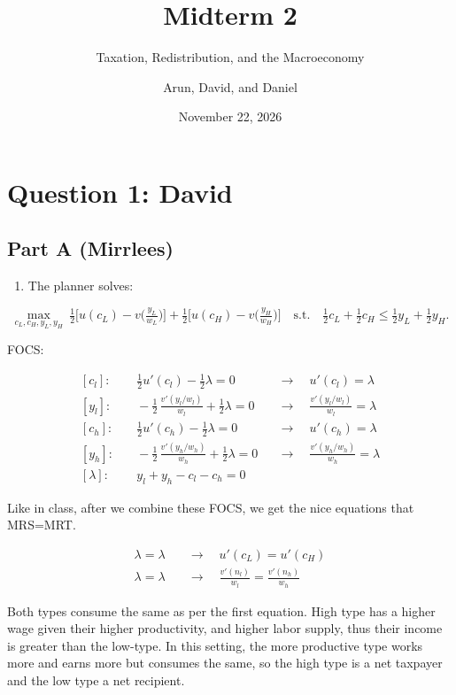 \documentclass[
  letterpaper,
  DIV=11,
  numbers=noendperiod]{scrartcl}
\title{Midterm 2}
\subtitle{Taxation, Redistribution, and the Macroeconomy}
\author{Arun, David, and Daniel}
\date{November 22, 2026}
\providecommand{\tightlist}{%
  \setlength{\itemsep}{0pt}\setlength{\parskip}{0pt}}
\begin{document}
\maketitle


\section{Question 1: David}\label{question-1-david}

\subsection{Part A (Mirrlees)}\label{part-a-mirrlees}

\begin{enumerate}
\def\labelenumi{\alph{enumi}.}
\tightlist
\item
  The planner solves:
\end{enumerate}

\[ 
\max_{c_L,c_H,y_L,y_H}\ \tfrac12\Big[u(c_L)-v\big(\tfrac{y_L}{w_L}\big)\Big]+\tfrac12\Big[u(c_H)-v\big(\tfrac{y_H}{w_H}\big)\Big]\quad\text{s.t.}\quad \tfrac12 c_L+\tfrac12 c_H \le \tfrac12 y_L+\tfrac12 y_H .
\]

FOCS:

\[
\begin{aligned}
[c_l]:&\quad \tfrac12 u'(c_l)-\tfrac12\lambda=0 &&\rightarrow\quad u'(c_l)=\lambda \\
[y_l]:&\quad -\tfrac12\,\frac{v'(y_l/w_l)}{w_l}+\tfrac12\lambda=0 &&\rightarrow\quad \frac{v'(y_l/w_l)}{w_l} = \lambda \\
[c_h]:&\quad \tfrac12 u'(c_h)-\tfrac12\lambda=0 &&\rightarrow\quad u'(c_h)=\lambda \\
[y_h]:&\quad -\tfrac12\,\frac{v'(y_h/w_h)}{w_h}+\tfrac12\lambda=0 &&\rightarrow\quad \frac{v'(y_h/w_h)}{w_h} = \lambda \\
[\lambda]:&\quad y_l + y_h - c_l - c_h = 0
\end{aligned}
\]

Like in class, after we combine these FOCS, we get the nice equations
that MRS=MRT.

\[
\begin{aligned}
\lambda = \lambda \quad &\rightarrow \quad u'(c_L)=u'(c_H) \\
\lambda = \lambda \quad &\rightarrow \quad \frac{v'(n_l)}{w_l} = \frac{v'(n_h)}{w_h}
\end{aligned}
\]

Both types consume the same as per the first equation. High type has a
higher wage given their higher productivity, and higher labor supply,
thus their income is greater than the low-type. In this setting, the
more productive type works more and earns more but consumes the same, so
the high type is a net taxpayer and the low type a net recipient.
\end{document}
